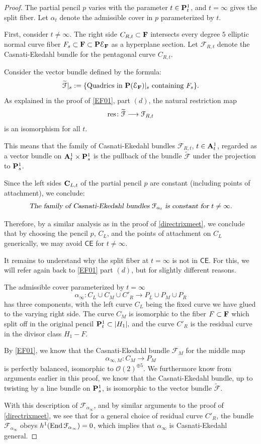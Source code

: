 \documentclass[reqno, 10 pt]{article}
\theoremstyle{definition}
\theoremstyle{remark}
\numberwithin{equation}{section}
\numberwithin{thm}{section}
\numberwithin{prop}{section}
\numberwithin{lem}{section}
\numberwithin{cor}{section}
\numberwithin{conj}{section}
\numberwithin{defn}{section}
\newcommand{\td}{\widetilde}
\newcommand{\F}{{\mathbf F}}
\renewcommand{\to}{\longrightarrow}
\newcommand{\sfCE}{{\mathsf {CE}}}
\newcommand{\cE}{{\mathcal E}}
\newcommand{\cF}{{\mathcal F}}
\newcommand{\cO}{{\mathcal O}}
\newcommand {\C}{{\bf C}}
\newcommand {\A}{{\bf A}}
\renewcommand{\P}{{\bf P}}
\renewcommand{\F}{{\bf F}}
\newcommand {\from}{{\colon}}
\newcommand {\End}{{\rm End \,}}
\newcommand {\res}{{\rm res}}
\begin{document}
\begin{proof}
The partial pencil $p$ varies with the parameter $t \in \P^{1}_{t}$, and $t= \infty$ gives the split fiber. Let $\alpha_{t}$ denote the admissible cover in $p$ parameterized by $t$.

First, consider $t \neq \infty.$  The right side $C_{R,t} \subset \F$ intersects every degree $5$ elliptic normal curve fiber $F_{s} \subset \F \subset \P \cE_{\F}$ as a hyperplane section. Let $\cF_{R,t}$ denote the Casnati-Ekedahl bundle for the pentagonal curve $C_{R,t}$.

 Consider the vector bundle defined by the formula: 
$$\td{\cF}|_{s} := \{\text{Quadrics in $\P(\cE_{\F})|_{s}$ containing $F_{s}$}\}.$$ As explained in the proof of \autoref{EF01}, part $(d)$, the natural restriction map 
$$\res \from \td{\cF} \to \cF_{R,t}$$ is an isomorphism for all $t$. 

This means that the family of Casnati-Ekedahl bundles $\cF_{R,t}$, $t \in \A^{1}_{t}$, regarded as a vector bundle on $\A^{1}_{t} \times \P^{1}_{s}$ is the pullback of the bundle $\td{\cF}$ under the projection to $\P^{1}_{s}$. 

Since the left sides $\C_{L,t}$ of the partial pencil $p$ are constant (including points of attachment), we conclude: $$\text{\sl The family of Casnati-Ekedahl bundles $\cF_{\alpha_{t}}$ is constant for $t \neq \infty$.}$$

Therefore, by a similar analysis as in the proof of \autoref{directrixmeet}, we conclude that by choosing the pencil $p$, $C_{L}$, and the points of attachment on $C_{L}$ generically, we may avoid $\sfCE$ for $t \neq \infty$. 

It remains to understand why the split fiber at $t=\infty$ is not in $\sfCE$. For this, we will refer again back to \autoref{EF01} part $(d)$, but for slightly different reasons.

The admissible cover parameterized by $t = \infty$ $$\alpha_{\infty} \from C_{L} \cup C_{M} \cup C'_{R} \to P_{L} \cup P_{M} \cup P_{R}$$ has three components, with the left curve $C_{L}$ being the fixed curve we have glued to the varying right side.  The curve $C_{M}$ is isomorphic to the fiber $F \subset \F$ which split off in the original pencil $\P^{1}_{t} \subset |H_{1}|,$ and the curve $C'_{R}$ is the residual curve in the divisor class $H_{1} - F$. 

By \autoref{EF01}, we know that the Casnati-Ekedahl bundle $\cF_{M}$ for the middle map $$\alpha_{\infty,M} \from C_{M} \to P_{M}$$ is perfectly balanced, isomorphic to $\cO(2)^{\oplus 5}$. We furthermore know from arguments earlier in this proof, we know that the Casnati-Ekedahl bundle, up to twisting by a line bundle on $\P^{1}_{s}$, is isomorphic to the vector bundle $\td{\cF}$. 

With this description of $\cF_{\alpha_{\infty}}$, and by similar arguments to the proof of \autoref{directrixmeet}, we see that for a general choice of residual curve $C'_{R}$, the bundle $\cF_{\alpha_{\infty}}$ obeys $h^{1}(\End \cF_{\alpha_{\infty}}) = 0$, which implies that $\alpha_{\infty}$ is Casnati-Ekedahl general. 


\end{proof}
\end{document}
